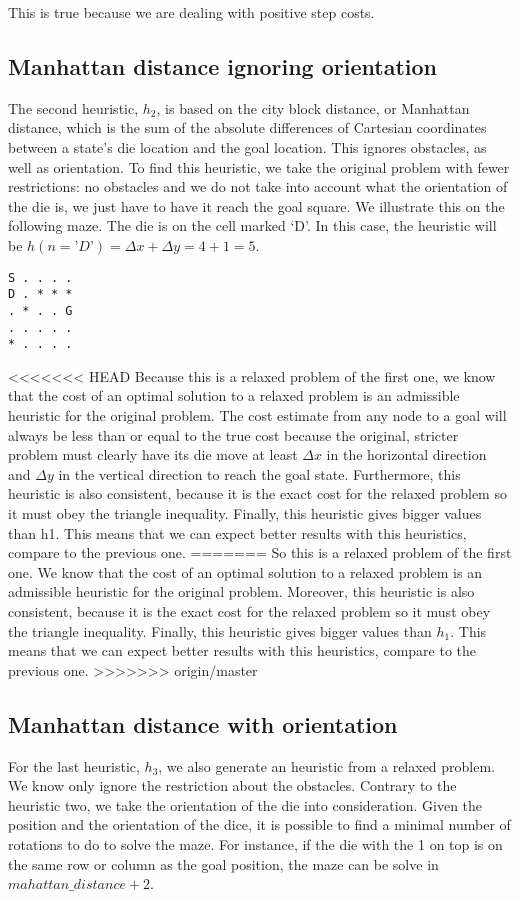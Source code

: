 \documentclass[]{article}
\begin{document}
This is true because we are dealing with positive step costs.

\subsection{Manhattan distance ignoring orientation}
The second heuristic, $h_2$, is based on the city block distance, or Manhattan distance, which is the sum of the absolute differences of Cartesian coordinates between a state's die location and the goal location.  This ignores obstacles, as well as orientation.
To find this heuristic, we take the original problem with fewer restrictions: no obstacles and we do not take into account what the orientation of the die is, we just have to have it reach the goal square. 
We illustrate this on the following maze.
The die is on the cell marked ‘D’.
In this case, the heuristic will be $h(n=’D’) = \Delta x + \Delta y = 4+1 = 5$.

\begin{lstlisting}
S . . . .
D . * * *
. * . . G
. . . . .
* . . . .
\end{lstlisting}

<<<<<<< HEAD
Because this is a relaxed problem of the first one, we know that the cost of an optimal solution to a relaxed problem is an admissible heuristic for the original problem.  The cost estimate from any node to a goal will always be less than or equal to the true cost because the original, stricter problem must clearly have its die move at least $\Delta x$ in the horizontal direction and $\Delta y$ in the vertical direction to reach the goal state.
Furthermore, this heuristic is also consistent, because it is the exact cost for the relaxed problem so it must obey the triangle inequality.
Finally, this heuristic gives bigger values than h1. This means that we can expect better results with this heuristics, compare to the previous one. 
=======
So this is a relaxed problem of the first one.
We know that the cost of an optimal solution to a relaxed problem is an admissible heuristic for the original problem.
Moreover, this heuristic is also consistent, because it is the exact cost for the relaxed problem so it must obey the triangle inequality.
Finally, this heuristic gives bigger values than $h_1$. This means that we can expect better results with this heuristics, compare to the previous one. 
>>>>>>> origin/master


\subsection{Manhattan distance with orientation}
For the last heuristic, $h_3$, we also generate an heuristic from a relaxed problem.
We know only ignore the restriction about the obstacles.
Contrary to the heuristic two, we take the orientation of the die into consideration.
Given the position and the orientation of the dice, it is possible to find a minimal number of rotations to do to solve the maze.
For instance, if the die with the 1 on top is on the same row or column as the goal position, the maze can be solve in $mahattan\_distance + 2$.
\end{document}
